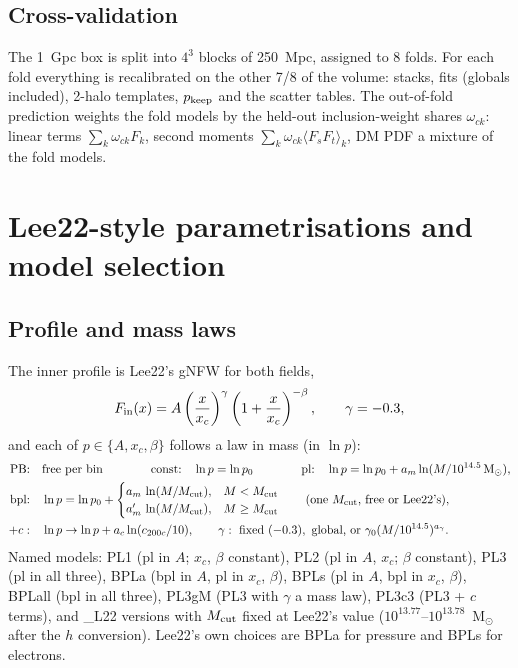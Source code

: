 \documentclass[10pt,a4paper]{article}
\newcommand{\pk}{p_{\rm keep}}
\begin{document}
\subsection{Cross-validation}
The 1~Gpc box is split into $4^3$ blocks of 250~Mpc, assigned to 8 folds. For each fold everything is recalibrated on the
other 7/8 of the volume: stacks, fits (globals included), 2-halo templates, $\pk$ and the scatter tables. The
out-of-fold prediction weights the fold models by the held-out inclusion-weight shares $\omega_{ck}$: linear terms
$\sum_k\omega_{ck}F_k$, second moments $\sum_k\omega_{ck}\langle F_sF_t\rangle_k$, DM PDF a mixture of the fold models.

\section{Lee22-style parametrisations and model selection}\label{sec:sel}

\subsection{Profile and mass laws}
The inner profile is Lee22's gNFW for both fields,
\begin{equation}
F_{\rm in}(x)=A\left(\frac{x}{x_c}\right)^{\gamma}\left(1+\frac{x}{x_c}\right)^{-\beta},\qquad \gamma=-0.3, \label{eq:lee22}
\end{equation}
and each of $p\in\{A,x_c,\beta\}$ follows a law in mass (in $\ln p$):
\begin{align}
\text{PB:}\quad&\text{free per bin}\qquad\qquad
\text{const:}\quad \ln p=\ln p_0\qquad\qquad
\text{pl:}\quad \ln p=\ln p_0+a_m\ln(M/10^{14.5}\,{\rm M}_\odot),\\
\text{bpl:}\quad&\ln p=\ln p_0+\begin{cases}a_m\,\ln(M/M_{\rm cut}),&M<M_{\rm cut}\\ a'_m\,\ln(M/M_{\rm cut}),&M\ge M_{\rm cut}\end{cases}
\qquad(\text{one }M_{\rm cut}\text{, free or Lee22's}),\\
+c:\quad&\ln p\to\ln p+a_c\ln(c_{200c}/10),\qquad
\gamma:\ \text{fixed}\ (-0.3),\ \text{global, or}\ \gamma_0(M/10^{14.5})^{a_\gamma}.
\end{align}
Named models: PL1 (pl in $A$; $x_c$, $\beta$ constant), PL2 (pl in $A$, $x_c$; $\beta$ constant), PL3 (pl in all three),
BPLa (bpl in $A$, pl in $x_c$, $\beta$), BPLs (pl in $A$, bpl in $x_c$, $\beta$), BPLall (bpl in all three), PL3gM (PL3 with $\gamma$ a mass law), PL3c3 (PL3 + $c$ terms), and
\_L22 versions with $M_{\rm cut}$ fixed at Lee22's value ($10^{13.77}$--$10^{13.78}$~M$_\odot$ after the $h$ conversion).
Lee22's own choices are BPLa for pressure and BPLs for electrons.
\end{document}
